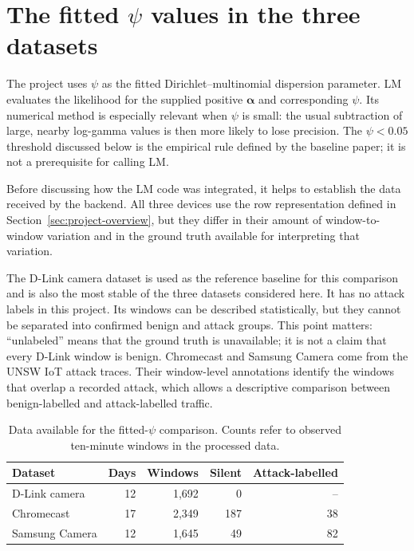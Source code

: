 \documentclass[11pt]{article}
\begin{document}
\section{The fitted \texorpdfstring{\(\psi\)}{psi} values in the three datasets}
\label{sec:dispersion}

The project uses \(\psi\) as the fitted Dirichlet--multinomial dispersion
parameter. LM evaluates the likelihood for the supplied positive
\(\boldsymbol{\alpha}\) and corresponding \(\psi\). Its numerical method is
especially relevant when \(\psi\) is small: the usual subtraction of large,
nearby log-gamma values is then more likely to lose precision. The
\(\psi<0.05\) threshold discussed below is the empirical rule defined by the
baseline paper; it is not a prerequisite for calling LM.

Before discussing how the LM code was integrated, it helps to establish the
data received by the backend. All three devices use the row representation
defined in Section~\ref{sec:project-overview}, but they differ in their amount
of window-to-window variation and in the ground truth available for
interpreting that variation.

The D-Link camera dataset is used as the reference baseline for this
comparison and is also the most stable of the three datasets considered here.
It has no attack labels in this project. Its windows can be described
statistically, but they cannot be separated into confirmed benign and attack
groups. This point matters: ``unlabeled'' means that the ground truth is
unavailable; it is not a claim that every D-Link window is benign. Chromecast
and Samsung Camera come from the UNSW IoT attack traces. Their window-level
annotations identify the windows that overlap a recorded attack, which allows
a descriptive comparison between benign-labelled and attack-labelled traffic.

\begin{table}[htbp]
\centering
\caption{Data available for the fitted-\(\psi\) comparison. Counts refer to
observed ten-minute windows in the processed data.}
\label{tab:data-coverage}
\begin{tabular}{lrrrr}
\toprule
Dataset & Days & Windows & Silent & Attack-labelled \\
\midrule
D-Link camera & 12 & 1,692 & 0 & -- \\
Chromecast & 17 & 2,349 & 187 & 38 \\
Samsung Camera & 12 & 1,645 & 49 & 82 \\
\bottomrule
\end{tabular}
\end{table}
\end{document}
